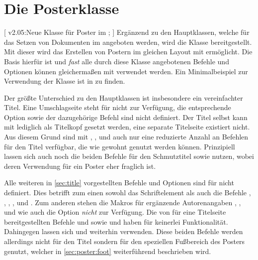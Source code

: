 \chapter[%
  Die Posterklasse \Class{tudscrposter}%
]{%
  Die Posterklasse%
}

\begin{DeclareEntity}{}
[
  v2.05:Neue Klasse für Poster im \TUDCD;
]
Ergänzend zu den Hauptklassen, welche für das Setzen von Dokumenten im \TUDCD 
angeboten werden, wird die Klasse  bereitgestellt. Mit 
dieser wird das Erstellen von Postern im gleichen Layout mit  
ermöglicht. Die Basis hierfür ist  und \emph{fast} alle 
durch diese Klasse angebotenen Befehle und Optionen können gleichermaßen mit 
 verwendet werden. Ein Minimalbeispiel zur Verwendung der 
Klasse ist in  zu finden.

Der größte Unterschied zu den Hauptklassen ist insbesondere ein vereinfachter 
Titel. Eine Umschlagseite steht für  nicht zur Verfügung, 
die entsprechende Option  sowie der dazugehörige Befehl 
 sind nicht definiert. Der Titel selbst kann mit 
 lediglich als Titelkopf gesetzt werden, eine separate 
Titelseite existiert nicht. Aus diesem Grund sind mit , 
,  und  auch nur eine 
reduzierte Anzahl an Befehlen für den Titel verfügbar, die wie gewohnt genutzt 
werden können. Prinzipiell lassen sich auch noch die beiden Befehle für den 
Schmutztitel  sowie  nutzen, wobei deren 
Verwendung für ein Poster eher fraglich ist.

Alle weiteren in \autoref{sec:title} vorgestellten Befehle und Optionen sind 
für  nicht definiert. Dies betrifft zum einen sowohl das 
Schriftelement  als auch die Befehle , 
, , ,  und 
. Zum anderen stehen die Makros für ergänzende 
Autorenangaben , , 
 und  wie auch 
die Option  \emph{nicht} zur Verfügung. Die von 
\KOMAScript für eine Titelseite bereitgestellten Befehle  
und  sowie  und 
 haben für  keinerlei 
Funktionalität. Dahingegen lassen sich  und  
weiterhin verwenden. Diese beiden Befehle werden allerdings nicht für den Titel 
sondern für den speziellen Fußbereich des Posters genutzt, welcher in 
\autoref{sec:poster:foot} weiterführend beschrieben wird.


\end{DeclareEntity}
